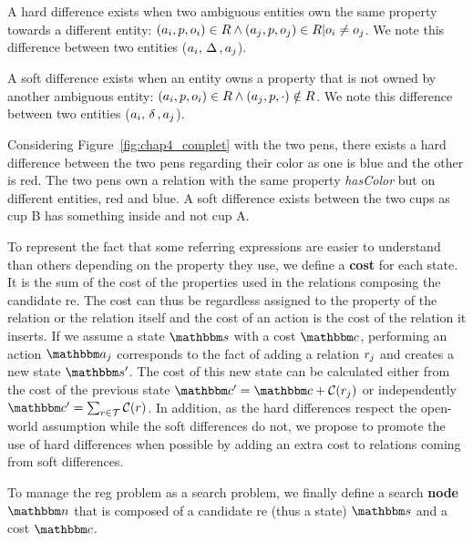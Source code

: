 \begin{definition}
A hard difference exists when two ambiguous entities own the same property towards a different entity: $(a_i, p, o_i) \in R \land (a_j, p, o_j) \in R | o_i \neq o_j$. We note this difference between two entities ($a_i, \,\Delta\,, a_j$).
\end{definition}

\begin{definition}
A soft difference exists when an entity owns a property that is not owned by another ambiguous entity: $(a_i, p, o_i) \in R \land (a_j, p, \cdot) \notin R$. We note this difference between two entities ($a_i, \,\delta\,, a_j$).
\end{definition}

Considering Figure~\ref{fig:chap4_complet} with the two pens, there exists a hard difference between the two pens regarding their color as one is blue and the other is red. The two pens own a relation with the same property \textit{hasColor} but on different entities, red and blue. A soft difference exists between the two cups as cup B has something inside and not cup A.

To represent the fact that some referring expressions are easier to understand than others depending on the property they use, we define a \textbf{cost} for each state. It is the sum of the cost of the properties used in the relations composing the candidate \acrshort{re}. The cost can thus be regardless assigned to the property of the relation or the relation itself and the cost of an action is the cost of the relation it inserts. If we assume a state $\state$ with a cost $\cost$, performing an action $\action_j$ corresponds to the fact of adding a relation $r_j$ and creates a new state $\state'$. The cost of this new state can be calculated either from the cost of the previous state $\cost' = \cost + \costfunc(\relation_j)$ or independently $\cost' = \sum_{\relation \in \mathcal{T}} \costfunc(\relation)$. In addition, as the hard differences respect the open-world assumption while the soft differences do not, we propose to promote the use of hard differences when possible by adding an extra cost to relations coming from soft differences.

To manage the \acrshort{reg} problem as a search problem, we finally define a search \textbf{node} $\node$ that is composed of a candidate \acrshort{re} (thus a state) $\state$ and a cost $\cost$.

